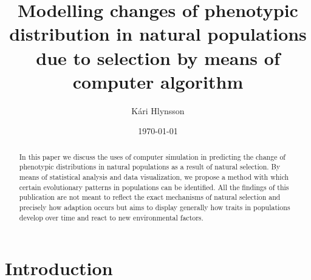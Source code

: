 \documentclass{article}
\begin{document}
    \title{Modelling changes of phenotypic distribution in natural populations due to selection by means of computer algorithm}
    \author{Kári Hlynsson}
    \date{\today}
    \maketitle

    \begin{abstract}
        \noindent In this paper we discuss the uses of computer simulation in predicting the change of phenotypic distributions in natural populations as a result of natural selection. By means of statistical analysis and data visualization, we propose a method with which certain evolutionary patterns in populations can be identified. All the findings of this publication are not meant to reflect the exact mechanisms of natural selection and precisely how adaption occurs but aims to display generally how traits in populations develop over time and react to new environmental factors. 
    \end{abstract}

    \section*{Introduction}
\end{document}
